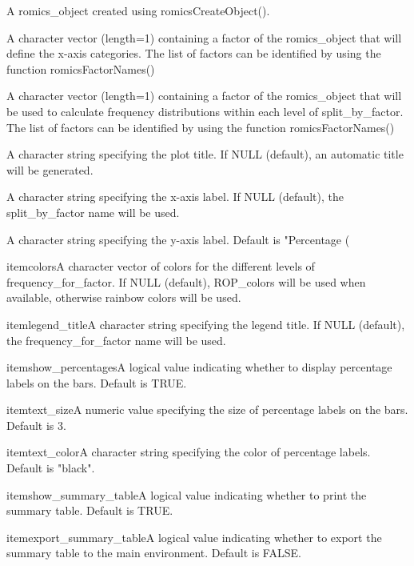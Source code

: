 \documentclass[a4paper]{book}
\begin{document}
%
\begin{Arguments}
\begin{ldescription}
\item[\code{romics\_object}] A romics\_object created using romicsCreateObject().

\item[\code{split\_by\_factor}] A character vector (length=1) containing a factor of the romics\_object that will define the x-axis categories. The list of factors can be identified by using the function romicsFactorNames()

\item[\code{frequency\_for\_factor}] A character vector (length=1) containing a factor of the romics\_object that will be used to calculate frequency distributions within each level of split\_by\_factor. The list of factors can be identified by using the function romicsFactorNames()

\item[\code{title}] A character string specifying the plot title. If NULL (default), an automatic title will be generated.

\item[\code{xlab}] A character string specifying the x-axis label. If NULL (default), the split\_by\_factor name will be used.

\item[\code{ylab}] A character string specifying the y-axis label. Default is "Percentage (

\bsl{}itemcolorsA character vector of colors for the different levels of frequency\_for\_factor. If NULL (default), ROP\_colors will be used when available, otherwise rainbow colors will be used.

\bsl{}itemlegend\_titleA character string specifying the legend title. If NULL (default), the frequency\_for\_factor name will be used.

\bsl{}itemshow\_percentagesA logical value indicating whether to display percentage labels on the bars. Default is TRUE.

\bsl{}itemtext\_sizeA numeric value specifying the size of percentage labels on the bars. Default is 3.

\bsl{}itemtext\_colorA character string specifying the color of percentage labels. Default is "black".

\bsl{}itemshow\_summary\_tableA logical value indicating whether to print the summary table. Default is TRUE.

\bsl{}itemexport\_summary\_tableA logical value indicating whether to export the summary table to the main environment. Default is FALSE.


\end{ldescription}
\end{Arguments}
\end{document}
